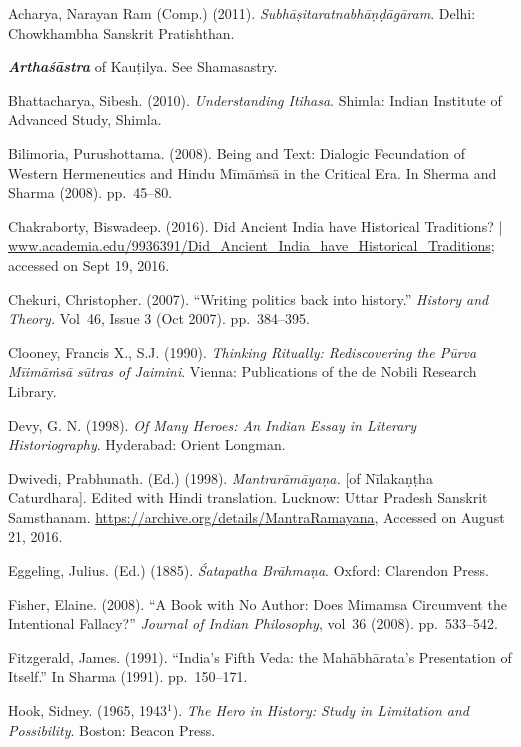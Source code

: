 \begin{thebibliography}{99}
 Acharya, Narayan Ram (Comp.) (2011). \textit{Subhāṣitaratnabhāṇḍāgāram}. Delhi: Chowkhambha Sanskrit Pratishthan.

  \textbf{\textit{Arthaśāstra}} of Kauṭilya. See Shamasastry.

  Bhattacharya, Sibesh. (2010). \textit{Understanding Itihasa}. Shimla: Indian Institute of Advanced Study, Shimla.

  Bilimoria, Purushottama. (2008). Being and Text: Dialogic Fecundation of Western Hermeneutics and Hindu Mīmāṁsā in the Critical Era. In Sherma and Sharma (2008). pp.~45--80.

  Chakraborty, Biswadeep. (2016). Did Ancient India have Historical Traditions? | \url{www.academia.edu/9936391/Did_Ancient_India_have_Historical_Traditions}; accessed on Sept 19, 2016.

  Chekuri, Christopher. (2007). “Writing politics back into history.” \textit{History and Theory.} Vol~46, Issue 3 (Oct 2007). pp.~384--395.

  Clooney, Francis X., S.J. (1990). \textit{Thinking Ritually: Rediscovering the Pūrva Mīimāṁsā sūtras of Jaimini}. Vienna: Publications of the de Nobili Research Library.

  Devy, G. N. (1998). \textit{Of Many Heroes: An Indian Essay in Literary Historiography}. Hyderabad: Orient Longman.

  Dwivedi, Prabhunath. (Ed.) (1998). \textit{Mantrarāmāyaṇa.} [of Nīlakaṇṭha Caturdhara]. Edited with Hindi translation. Lucknow: Uttar Pradesh Sanskrit Samsthanam. \url{https://archive.org/details/MantraRamayana}, Accessed on August 21, 2016.

  Eggeling, Julius. (Ed.) (1885). \textit{Śatapatha Brāhmaṇa}. Oxford: Clarendon Press.

  Fisher, Elaine. (2008). “A Book with No Author: Does Mimamsa Circumvent the Intentional Fallacy?” \textit{Journal of Indian Philosophy}, vol~36 (2008). pp.~533--542.

  Fitzgerald, James. (1991). “India’s Fifth Veda: the Mahābhārata’s Presentation of Itself.” In Sharma (1991). pp.~150--171.

  Hook, Sidney. (1965, 1943$^{1}$). \textit{The Hero in History: Study in Limitation and Possibility}. Boston: Beacon Press.


\end{thebibliography}
